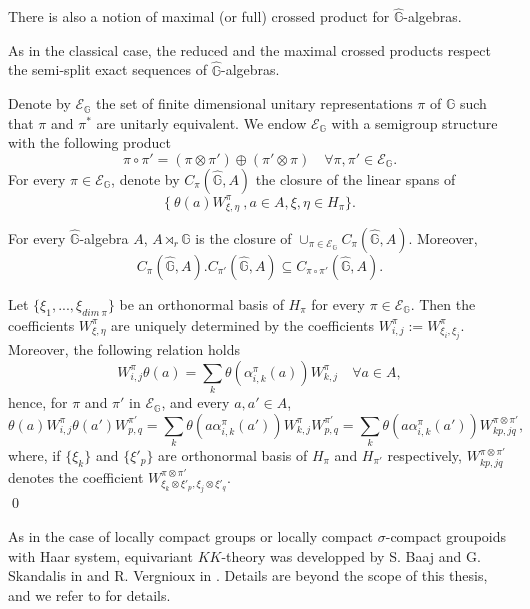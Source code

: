 \begin{rk}
There is also a notion of maximal (or full) crossed product for $\hat{\mathbb G}$-algebras.
\end{rk}

\begin{rk}
As in the classical case, the reduced and the maximal crossed products respect the semi-split exact sequences of $\hat{\mathbb G}$-algebras.
\end{rk}

Denote by $\mathcal E_{\mathbb G}$ the set of finite dimensional unitary representations $\pi$ of $\mathbb G$ such that $\pi$ and $\pi^*$ are unitarly equivalent. We endow $\mathcal E_{\mathbb G}$ with a semigroup structure with the following product 
\[\pi\circ \pi' = (\pi\otimes\pi')\oplus (\pi'\otimes \pi)\quad \forall \pi,\pi'\in \mathcal E_{\mathbb G}.\]
For every $\pi\in \mathcal E_{\mathbb G}$, denote by $C_\pi(\hat{\mathbb G}, A)$ the closure of the linear spans of 
\[\{\ \theta(a) W_{\xi,\eta}^\pi \ ,a\in A, \xi,\eta\in H_\pi\}.\]

\begin{prop} 
For every $\hat{\mathbb G}$-algebra $A$, $A\rtimes_r \hat{\mathbb G}$ is the closure of $\cup_{\pi\in \mathcal E_{\mathbb G}} C_\pi(\hat{\mathbb G}, A)$. Moreover,
\[C_\pi(\hat{\mathbb G}, A).C_{\pi'}(\hat{\mathbb G}, A) \subseteq C_{\pi \circ \pi'}(\hat{\mathbb G}, A).\]
\end{prop}

\begin{dem}
Let $\{\xi_1,...,\xi_{dim\ \pi}\}$ be an orthonormal basis of $H_\pi$ for every $\pi\in\mathcal E_{\mathbb G}$. Then the coefficients $W_{\xi,\eta}^\pi$ are uniquely determined by the coefficients $W_{i,j}^\pi := W_{\xi_i,\xi_j}^\pi$. Moreover, the following relation holds
\[W_{i,j}^\pi \theta(a)= \sum_k \theta(\alpha_{i,k}^\pi(a)) W_{k,j}^\pi \quad \forall a\in A,\]
hence, for $\pi$ and $\pi'$ in $\mathcal E_{\mathbb G}$, and every $a,a'\in A$,
\[\theta(a) W_{i,j}^\pi \theta(a')W_{p,q}^{\pi'} = \sum_k \theta(a \alpha_{i,k}^{\pi}(a')) W_{k,j}^\pi W_{p,q}^{\pi'} 
= \sum_k \theta(a \alpha_{i,k}^{\pi}(a')) W_{kp,jq}^{\pi\otimes \pi'}, \]
where, if $\{\xi_k\}$ and $\{\xi'_p\}$ are orthonormal basis of $H_\pi$ and $H_{\pi'}$ respectively, $W_{kp,jq}^{\pi\otimes \pi'}$ denotes the coefficient $W_{\xi_k\otimes \xi'_p,\xi_j \otimes \xi'_q}^{\pi\otimes \pi'}$.\\
\qed
\end{dem}

As in the case of locally compact groups or locally compact $\sigma$-compact groupoids with Haar system, equivariant $KK$-theory was developped by S. Baaj and G. Skandalis in \cite{BaajSk} and R. Vergnioux in \cite{vergnioux}. Details are beyond the scope of this thesis, and we refer to \cite{vergnioux} for details.\\

